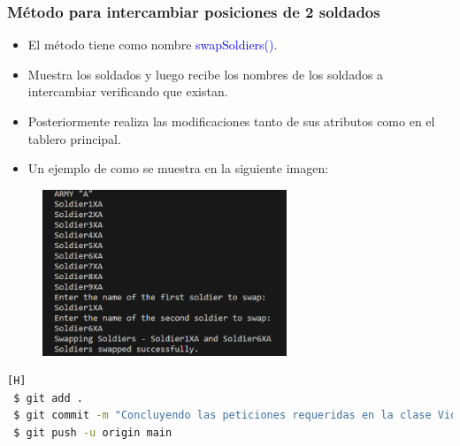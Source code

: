\documentclass{article}
\begin{document}
\subsubsection{Método para intercambiar posiciones de 2 soldados}
\begin{itemize}
    \item El método tiene como nombre \textcolor{blue}{swapSoldiers()}.
    \item Muestra los soldados y luego recibe los nombres de los soldados a intercambiar verificando que existan.
    \item Posteriormente realiza las modificaciones tanto de sus atributos como en el tablero principal.
\end{itemize}


\begin{itemize}\begin{itemize}\item Un ejemplo de como se muestra en la siguiente imagen:
\end{itemize}\end{itemize}
\begin{figure}[H]
    \centering
    \includegraphics[width=0.65\textwidth,keepaspectratio]{img/12swapSoldiers.png}
    \caption{}
\end{figure}

\begin{lstlisting}[language=bash,caption={Commit \href{https://github.com/hernanchoquehuanca/fp2-23b/commit/e1a4207fd503551b8f3cb55473c173f8a6b60ccb}{e1a4207}: Concluyendo las peticiones requeridas en la clase VideoJuego7.java}][H]
 $ git add .
 $ git commit -m "Concluyendo las peticiones requeridas en la clase VideoJuego7.java"
 $ git push -u origin main
\end{lstlisting}

\newpage
\end{document}
